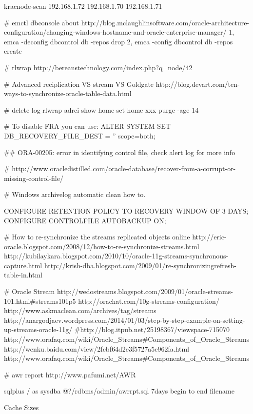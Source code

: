 \begin{table}
 kracnode-scan     192.168.1.72
                   192.168.1.70
                                     192.168.1.71


# emctl dbconsole about
http://blog.mclaughlinsoftware.com/oracle-architecture-configuration/changing-windows-hostname-and-oracle-enterprise-manager/
1, emca -deconfig dbcontrol db -repos drop
2, emca -config dbcontrol db -repos create

# rlwrap 
http://bereanstechnology.com/index.php?q=node/42

#  Advanced reciplication VS stream VS Goldgate
http://blog.devart.com/ten-ways-to-synchronize-oracle-table-data.html

# delete log
rlwrap adrci
show home 
set home xxx
 purge -age 14


# To disable FRA you can use:
  ALTER SYSTEM SET DB_RECOVERY_FILE_DEST = '' scope=both;

## ORA-00205: error in identifying control file, check alert log for more info

#  http://www.oracledistilled.com/oracle-database/recover-from-a-corrupt-or-missing-control-file/


# Windows archivelog automatic clean how to.

 CONFIGURE RETENTION POLICY TO RECOVERY WINDOW OF 3 DAYS;
 CONFIGURE CONTROLFILE AUTOBACKUP ON;


# How to re-synchronize the streams replicated objects online 
http://eric-oracle.blogspot.com/2008/12/how-to-re-synchronize-streams.html
http://kubilaykara.blogspot.com/2010/10/oracle-11g-streams-synchronous-capture.html
http://krish-dba.blogspot.com/2009/01/re-synchronizingrefresh-table-in.html


# Oracle Stream
http://wedostreams.blogspot.com/2009/01/oracle-streams-101.html#streams101p5
http://orachat.com/10g-streams-configuration/
http://www.askmaclean.com/archives/tag/streams
http://anargodjaev.wordpress.com/2014/01/03/step-by-step-example-on-setting-up-streams-oracle-11g/
#http://blog.itpub.net/25198367/viewspace-715070
http://www.orafaq.com/wiki/Oracle_Streams#Components_of_Oracle_Streams
http://wenku.baidu.com/view/2fcbf64d2e3f5727a5e962fa.html
http://www.orafaq.com/wiki/Oracle_Streams#Components_of_Oracle_Streams

# awr report 
http://www.pafumi.net/AWR%

sqlplus / as sysdba
@?/rdbms/admin/awrrpt.sql
7days
begin to end
filename

Cache Sizes


\end{table}
